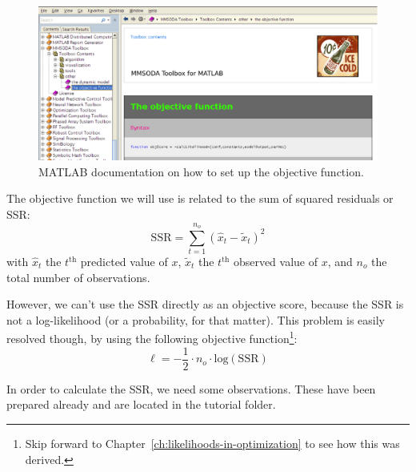 
\begin{figure}[htb]
  \centering
    \includegraphics[width=\textwidth]{./../eps/doc-the-objective-function.eps}
  \caption{MATLAB documentation on how to set up the objective function.}
  \label{fig:doc-the-objective-function}
\end{figure}


The objective function we will use is related to the sum of squared residuals  or SSR:
\begin{equation}\label{eq:SSR}
\mathrm{SSR} = \displaystyle\sum\limits_{t=1}^{n_o}(\hat{x}_{t}-\tilde{x}_{t})^2
\end{equation}
with $\hat{x}_{t}$ the $t^{\mathrm{th}}$ predicted value of $x$, $\tilde{x}_{t}$ the $t^{\mathrm{th}}$ observed value of $x$, and $n_o$ the total number of observations.

However, we can't use the SSR directly as an objective score, because the SSR is not a log-likelihood (or a probability, for that matter). This problem is easily resolved though, by using the following objective function\footnote{Skip forward to Chapter~\ref{ch:likelihoods-in-optimization} to see how this was derived.}:
\begin{equation}\label{eq:objScore}
\ell = -\frac{1}{2} \cdot{} n_o \cdot{} \mathrm{log}\left(\mathrm{SSR}\right)
\end{equation}

In order to calculate the SSR, we need some observations. These have been prepared already and are located in the tutorial folder.

